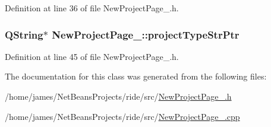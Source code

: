 Definition at line 36 of file New\-Project\-Page\-\_.\-h.

\hypertarget{class_new_project_page__2_a11cf2e27845bca28160711333975f68c}{
\subsubsection[{project\-Type\-Str\-Ptr}]{\setlength{\rightskip}{0pt plus 5cm}Q\-String$\ast$ New\-Project\-Page\-\_\-::project\-Type\-Str\-Ptr\hspace{0.3cm}{\ttfamily [private]}}}\label{class_new_project_page__2_a11cf2e27845bca28160711333975f68c}


Definition at line 45 of file New\-Project\-Page\-\_.\-h.



The documentation for this class was generated from the following files\-:\begin{DoxyCompactItemize}
\item 
/home/james/\-Net\-Beans\-Projects/ride/src/\hyperlink{_new_project_page__2_8h}{New\-Project\-Page\-\_.\-h}\item 
/home/james/\-Net\-Beans\-Projects/ride/src/\hyperlink{_new_project_page__2_8cpp}{New\-Project\-Page\-\_.\-cpp}\end{DoxyCompactItemize}
